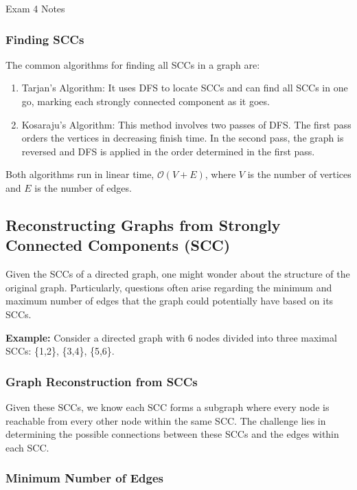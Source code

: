 \begin{examnotes}{Exam 4 Notes}
    \subsubsection*{Finding SCCs}
    
    The common algorithms for finding all SCCs in a graph are:
    \begin{enumerate}
        \item Tarjan's Algorithm: It uses DFS to locate SCCs and can find all SCCs in one go, marking each strongly connected component as it goes.
        \item Kosaraju's Algorithm: This method involves two passes of DFS. The first pass orders the vertices in decreasing finish time. In the second pass, the graph is reversed and DFS is applied 
        in the order determined in the first pass.
    \end{enumerate}
    Both algorithms run in linear time, $\mathcal{O}(V + E)$, where $V$ is the number of vertices and $E$ is the number of edges.

    \subsection*{Reconstructing Graphs from Strongly Connected Components (SCC)}

    Given the SCCs of a directed graph, one might wonder about the structure of the original graph. Particularly, questions often arise regarding the minimum and maximum number of edges that the graph 
    could potentially have based on its SCCs.

    \begin{highlight}
        \textbf{Example:} Consider a directed graph with 6 nodes divided into three maximal SCCs: \{1,2\}, \{3,4\}, \{5,6\}.
        
        \subsubsection*{Graph Reconstruction from SCCs}
        
        Given these SCCs, we know each SCC forms a subgraph where every node is reachable from every other node within the same SCC. The challenge lies in determining the possible connections between these 
        SCCs and the edges within each SCC.
        
        \subsubsection*{Minimum Number of Edges}
        

\end{highlight}
\end{examnotes}
